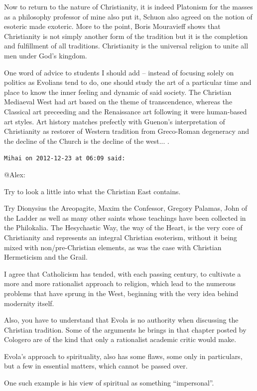 \begin{footnotesize}
\begin{sffamily}
Now to return to the nature of Christianity, it is indeed Platonism for the masses as a philosophy professor of mine also put it, Schuon also agreed on the notion of esoteric made exoteric. More to the point, Boris Mouravieff shows that Christianity is not simply another form of the tradition but it is the completion and fulfillment of all traditions. Christianity is the universal religion to unite all men under God's kingdom.

One word of advice to students I should add -- instead of focusing solely on politics as Evolians tend to do, one should study the art of a particular time and place to know the inner feeling and dynamic of said society. The Christian Mediaeval West had art based on the theme of transcendence, whereas the Classical art preceeding and the Renaissance art following it were human-based art styles. Art history matches prefectly with Guenon's interpretation of Christianity as restorer of Western tradition from Greco-Roman degeneracy and the decline of the Church is the decline of the west... .

\hfill

\texttt{Mihai on 2012-12-23 at 06:09 said:}

@Alex:

Try to look a little into what the Christian East contains.

Try Dionysius the Areopagite, Maxim the Confessor, Gregory Palamas, John of the Ladder as well as many other saints whose teachings have been collected in the Philokalia. The Hesychastic Way, the way of the Heart, is the very core of Christianity and represents an integral Christian esoterism, without it being mixed with non/pre-Christian elements, as was the case with Christian Hermeticism and the Grail.

I agree that Catholicism has tended, with each passing century, to cultivate a more and more rationalist approach to religion, which lead to the numerous problems that have sprung in the West, beginning with the very idea behind modernity itself.

Also, you have to understand that Evola is no authority when discussing the Christian tradition. Some of the arguments he brings in that chapter posted by Cologero are of the kind that only a rationalist academic critic would make.

Evola's approach to spirituality, also has some flaws, some only in particulars, but a few in essential matters, which cannot be passed over.

One such example is his view of spiritual as something ``impersonal''.


\end{sffamily}
\end{footnotesize}
